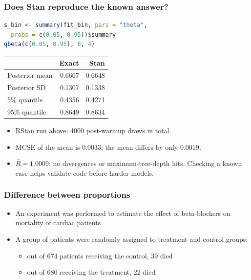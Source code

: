 \documentclass[10pt]{beamer}
\begin{document}
\begin{frame}[fragile]
\frametitle{Does Stan reproduce the known answer?}

{\small
\begin{lstlisting}[language=R]
s_bin <- summary(fit_bin, pars = "theta",
  probs = c(0.05, 0.95))$summary
qbeta(c(0.05, 0.95), 8, 4)
\end{lstlisting}
}

\begin{center}
\begin{tabular}{lrr}
 & Exact & Stan \\
\hline
Posterior mean & 0.6667 & 0.6648 \\
Posterior SD & 0.1307 & 0.1338 \\
5\% quantile & 0.4356 & 0.4271 \\
95\% quantile & 0.8649 & 0.8634
\end{tabular}
\end{center}

\begin{itemize}
\item RStan run above: 4000 post-warmup draws in total.
\item MCSE of the mean is $0.0033$; the mean differs by only $0.0019$.
\item $\widehat R=1.0009$; no divergences or maximum-tree-depth hits.
  Checking a known case helps validate code before harder models.
\end{itemize}
\end{frame}

\begin{frame}[fragile]

\frametitle{Difference between proportions}

\begin{itemize}
  \item An experiment was performed to estimate the effect of
    beta-blockers on mortality of cardiac patients
  \item A group of
    patients were randomly assigned to treatment and control groups:
    \begin{itemize}
    \item out of 674 patients receiving the control, 39 died
    \item out of 680 receiving the treatment, 22 died
    \end{itemize}
  \end{itemize}
\end{frame}
\end{document}
